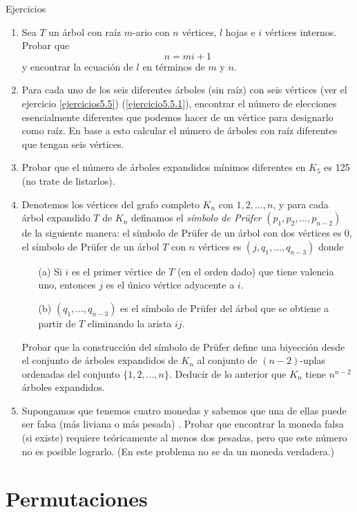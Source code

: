 \documentclass[11pt,spanish,makeidx]{amsbook}
\theoremstyle{definition}
\theoremstyle{remark}
\begin{document}
\begin{section}{Ejercicios}
\begin{enumerate}
\item Sea $T$ un árbol con raíz $m$-ario con $n$ vértices, $l$ hojas e $i$ vértices internos. Probar que
$$
n=mi+1
$$
y encontrar la ecuación de $l$ en términos de $m$ y $n$.
\item Para cada uno de los seis diferentes árboles (sin raíz) con seis vértices (ver el ejercicio \ref{ejercicios5.5}) (\ref{ejercicio5.5.1}), encontrar el número de elecciones esencialmente diferentes que podemos hacer de un vértice para designarlo como raíz. En base a esto calcular el número de árboles con raíz diferentes que tengan seis vértices.
\item Probar que el número de árboles expandidos mínimos diferentes en $K_5$ es 125 (no trate de listarlos). \item Denotemos los vértices del grafo completo $K_n$ con $1, 2, \ldots,n$, y para cada árbol expandido $T$ de $K_n$ definamos el {\em símbolo de Prüfer} $(p_1,p_2,\ldots,p_{n-2})$ de la  siguiente manera: el símbolo de Prüfer de un árbol con dos vértices es $0$, el símbolo de Prüfer de un árbol $T$ con $n$ vértices es $(j,q_1,\ldots,q_{n-3})$ donde
\begin{enumerate}
\item[(a)]  Si $i$ es el primer vértice de $T$ (en el orden dado) que tiene valencia uno, entonces $j$ es el único vértice adyacente a $i$.
\item[(b)] $(q_1,\ldots,q_{n-3})$ es el símbolo de Prüfer del árbol que se obtiene a partir de $T$ eliminando la arista $ij$.
\end{enumerate}
Probar que la construcción del símbolo de Prüfer define una biyección desde el conjunto de árboles expandidos de $K_n$ al conjunto de $(n-2)$-uplas ordenadas del conjunto $\{1,2,\ldots,n\}$. Deducir de lo anterior que $K_n$ tiene $n^{n-2}$ árboles expandidos.
\item Supongamos que tenemos cuatro monedas y sabemos que una de ellas puede ser falsa (más liviana o más pesada) . Probar que encontrar la moneda falsa (si existe) requiere teóricamente al menos dos pesadas, pero que este número no es posible lograrlo. (En este problema no se da un moneda verdadera.)
\end{enumerate}
\end{section}

\appendix
\setcounter{chapter}{0}
\renewcommand{\thechapter}{\Alph{chapter}}
\chapter[Permutaciones]{Permutaciones}
\end{document}
